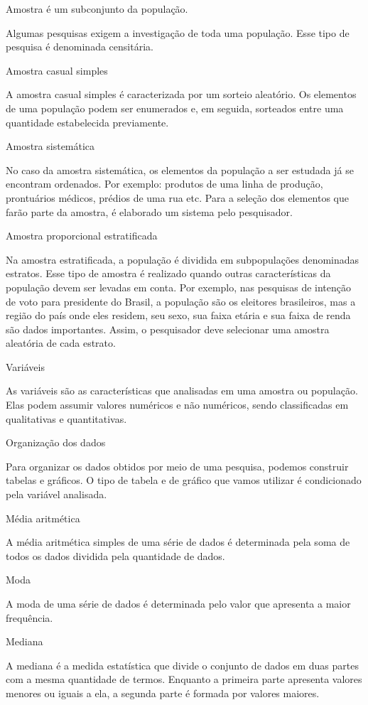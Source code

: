 Amostra é um subconjunto da população.

Algumas pesquisas exigem a investigação de toda uma população. Esse tipo
de pesquisa é denominada censitária.

Amostra casual simples

A amostra casual simples é caracterizada por um sorteio aleatório. Os
elementos de uma população podem ser enumerados e, em seguida, sorteados
entre uma quantidade estabelecida previamente.

Amostra sistemática

No caso da amostra sistemática, os elementos da população a ser estudada
já se encontram ordenados. Por exemplo: produtos de uma linha de
produção, prontuários médicos, prédios de uma rua etc. Para a seleção
dos elementos que farão parte da amostra, é elaborado um sistema pelo
pesquisador.

Amostra proporcional estratificada

Na amostra estratificada, a população é dividida em subpopulações
denominadas estratos. Esse tipo de amostra é realizado quando outras
características da população devem ser levadas em conta. Por exemplo,
nas pesquisas de intenção de voto para presidente do Brasil, a população
são os eleitores brasileiros, mas a região do país onde eles residem,
seu sexo, sua faixa etária e sua faixa de renda são dados importantes.
Assim, o pesquisador deve selecionar uma amostra aleatória de cada
estrato.

Variáveis

As variáveis são as características que analisadas em uma amostra ou
população. Elas podem assumir valores numéricos e não numéricos, sendo
classificadas em qualitativas e quantitativas.

Organização dos dados

Para organizar os dados obtidos por meio de uma pesquisa, podemos
construir tabelas e gráficos. O tipo de tabela e de gráfico que vamos
utilizar é condicionado pela variável analisada.

Média aritmética

A média aritmética simples de uma série de dados é determinada pela soma
de todos os dados dividida pela quantidade de dados.

Moda

A moda de uma série de dados é determinada pelo valor que apresenta a
maior frequência.

Mediana

A mediana é a medida estatística que divide o conjunto de dados em duas
partes com a mesma quantidade de termos. Enquanto a primeira parte
apresenta valores menores ou iguais a ela, a segunda parte é formada por
valores maiores.

